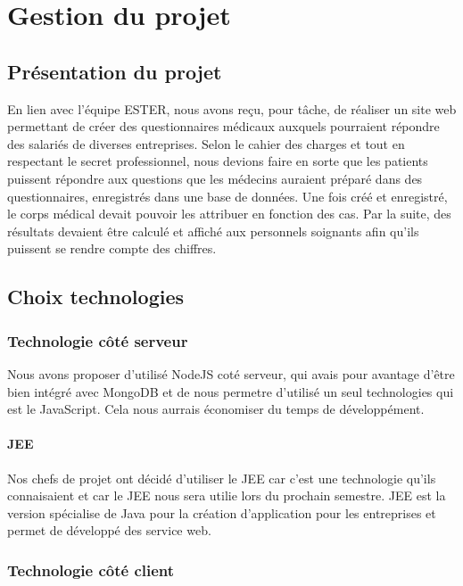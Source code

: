 \chapter{Gestion du projet}

\section{Présentation du projet}

En lien avec l'équipe ESTER, nous avons reçu, pour tâche, de réaliser un site web permettant de créer des questionnaires médicaux auxquels pourraient répondre des salariés de diverses entreprises. Selon le cahier des charges et tout en respectant le secret professionnel, nous devions faire en sorte que les patients puissent répondre aux questions que les médecins auraient préparé dans des questionnaires, enregistrés dans une base de données. Une fois créé et enregistré, le corps médical devait pouvoir les attribuer en fonction des cas. Par la suite, des résultats devaient être calculé et affiché aux personnels soignants afin qu'ils puissent se rendre compte des chiffres. 

\section{Choix technologies}

\subsection{Technologie côté serveur}

Nous avons proposer d'utilisé NodeJS coté serveur, qui avais pour avantage d'être bien intégré avec MongoDB
et de nous permetre d'utilisé un seul technologies qui est le JavaScript. Cela nous aurrais économiser du 
temps de développément.

\subsubsection{JEE}

Nos chefs de projet ont décidé d'utiliser le JEE car c'est une technologie qu'ils connaisaient et car le 
JEE nous sera utilie lors du prochain semestre. JEE est la version spécialise de Java pour la création 
d'application pour les entreprises et permet de développé des service web.

\subsection{Technologie côté client}

